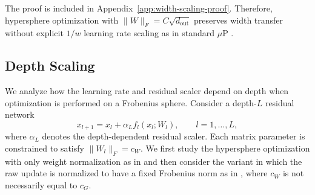 \documentclass{article}
\begin{document}
The proof is included in Appendix~\ref{app:width-scaling-proof}. Therefore, hypersphere optimization with $\|W\|_F = C\sqrt{d_{\mathrm{out}}}$ preserves width transfer without explicit $1/w$ learning rate scaling as in standard $\mu$P .



\subsection{Depth Scaling}\label{sec:depth-theory}


We analyze how the learning rate and residual scaler depend on depth when optimization is performed on a Frobenius sphere. Consider a depth-\(L\) residual network
\begin{equation}
x_{l+1} = x_l + \alpha_L f_l(x_l;W_l), \qquad l=1,\dots,L,
\label{eq:residual_depth_fnorm}
\end{equation}
where \(\alpha_L\) denotes the depth-dependent residual scaler. Each matrix parameter is constrained to satisfy \(\|W_l\|_F = c_W\). We first study the hypersphere optimization with only weight normalization as in  and then consider the variant in which the raw update is normalized to have a fixed Frobenius norm as in , where $c_W$ is not necessarily equal to $c_G$.
\end{document}
